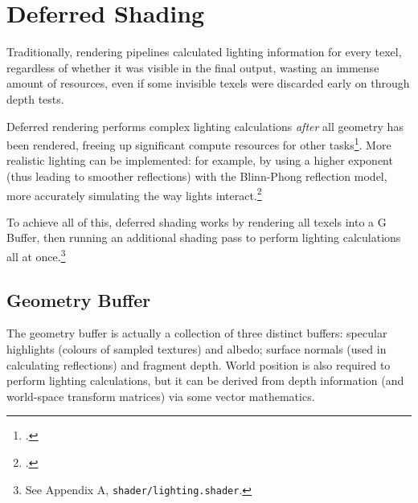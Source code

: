 \documentclass[11pt, oneside]{report}
\begin{document}
\chapter{Deferred Shading}
Traditionally, rendering pipelines calculated lighting information for every \gls{texel}, regardless of whether it was visible in the final output, wasting an immense amount of resources, even if some invisible \glspl{texel} were discarded early on through \glspl{depth test}.

Deferred rendering performs complex lighting calculations \textit{after} all geometry has been rendered, freeing up significant compute resources for other tasks\footcite{gpupro-deferred}. More realistic lighting can be implemented: for example, by using a higher exponent (thus leading to smoother reflections) with the \gls{Blinn-Phong reflection model}, more accurately simulating the way lights interact.\footcite{ferko-deferred}

To achieve all of this, deferred shading works by rendering all texels into a \gls{G Buffer}, then running an additional shading pass to perform lighting calculations all at once.\footnote{See Appendix A, \texttt{shader/lighting.shader}.}

\section{Geometry Buffer}
The geometry buffer is actually a collection of three distinct buffers: \gls{specular} highlights (colours of sampled textures) and albedo; surface normals (used in calculating reflections) and fragment depth. World position is also required to perform lighting calculations, but it can be derived from depth information (and world-space transform matrices) via some vector mathematics.
\end{document}
